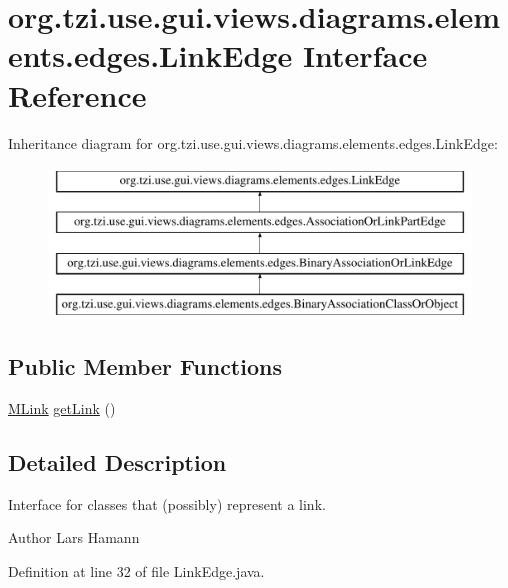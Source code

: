 \hypertarget{interfaceorg_1_1tzi_1_1use_1_1gui_1_1views_1_1diagrams_1_1elements_1_1edges_1_1_link_edge}{\section{org.\-tzi.\-use.\-gui.\-views.\-diagrams.\-elements.\-edges.\-Link\-Edge Interface Reference}
\label{interfaceorg_1_1tzi_1_1use_1_1gui_1_1views_1_1diagrams_1_1elements_1_1edges_1_1_link_edge}
}
Inheritance diagram for org.\-tzi.\-use.\-gui.\-views.\-diagrams.\-elements.\-edges.\-Link\-Edge\-:\begin{figure}[H]
\begin{center}
\leavevmode
\includegraphics[height=4.000000cm]{interfaceorg_1_1tzi_1_1use_1_1gui_1_1views_1_1diagrams_1_1elements_1_1edges_1_1_link_edge}
\end{center}
\end{figure}
\subsection*{Public Member Functions}
\begin{DoxyCompactItemize}
\item 
\hyperlink{interfaceorg_1_1tzi_1_1use_1_1uml_1_1sys_1_1_m_link}{M\-Link} \hyperlink{interfaceorg_1_1tzi_1_1use_1_1gui_1_1views_1_1diagrams_1_1elements_1_1edges_1_1_link_edge_a555d7d41c2948d0c204ece5ffd4429bd}{get\-Link} ()
\end{DoxyCompactItemize}


\subsection{Detailed Description}
Interface for classes that (possibly) represent a link. \begin{DoxyAuthor}{Author}
Lars Hamann 
\end{DoxyAuthor}


Definition at line 32 of file Link\-Edge.\-java.



